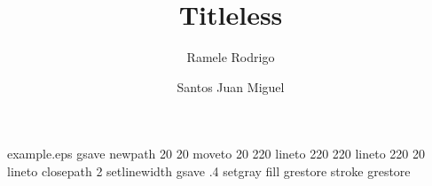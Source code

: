 %
%
%
%
%
\begin{filecontents*}{example.eps}
gsave
newpath
  20 20 moveto
  20 220 lineto
  220 220 lineto
  220 20 lineto
closepath
2 setlinewidth
gsave
  .4 setgray fill
grestore
stroke
grestore
\end{filecontents*}
%
\RequirePackage{fix-cm}
%
\documentclass[smallextended]{svjour3}       %
%
\smartqed  %
%
\usepackage{graphicx}
%
%
%
%
%


\title{Titleless%
}


\author{Ramele Rodrigo        \and
        Santos Juan Miguel %
}



